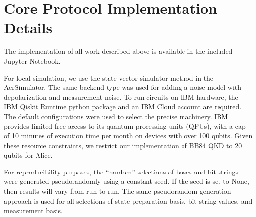 \section{Core Protocol Implementation Details}\label{app:protocol-details}

The implementation of all work described above is available in the included Jupyter Notebook.

For local simulation, we use the state vector simulator method in the AerSimulator. The same backend type was used for adding a noise model with depolarization and measurement noise. To run circuits on IBM hardware, the IBM Qiskit Runtime python package and an IBM Cloud account are required. The default configurations were used to select the precise machinery. IBM provides limited free access to its quantum processing units (QPUs), with a cap of 10 minutes of execution time per month on devices with over 100 qubits. Given these resource constraints, we restrict our implementation of BB84 QKD to 20 qubits for Alice.

For reproducibility purposes, the ``random'' selections of bases and bit-strings were generated pseudorandomly using a constant seed. If the seed is set to None, then results will vary from run to run. The same pseudorandom generation approach is used for all selections of state preparation basis, bit-string values, and measurement basis.